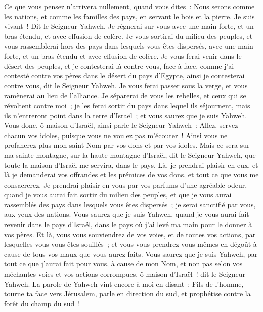 \begin{multicols}{2}
Ce que vous pensez n'arrivera nullement, quand vous dites~: Nous serons comme les nations, et comme les familles des pays, en servant le bois et la pierre.
Je suis vivant~! Dit le Seigneur Yahweh. Je règnerai sur vous avec une main forte, et un bras étendu, et avec effusion de colère.
Je vous sortirai du milieu des peuples, et vous rassemblerai hors des pays dans lesquels vous êtes dispersés, avec une main forte, et un bras étendu et avec effusion de colère.
Je vous ferai venir dans le désert des peuples, et je contesterai là contre vous, face à face,
comme j'ai contesté contre vos pères dans le désert du pays d'Egypte, ainsi je contesterai contre vous, dit le Seigneur Yahweh.
Je vous ferai passer sous la verge, et vous ramènerai au lieu de l'alliance.
Je séparerai de vous les rebelles, et ceux qui se révoltent contre moi~; je les ferai sortir du pays dans lequel ils séjournent, mais ils n'entreront point dans la terre d'Israël~; et vous saurez que je suis Yahweh.
Vous donc, ô maison d'Israël, ainsi parle le Seigneur Yahweh~: Allez, servez chacun vos idoles, puisque vous ne voulez pas m'écouter~! Ainsi vous ne profanerez plus mon saint Nom par vos dons et par vos idoles.
Mais ce sera sur ma sainte montagne, sur la haute montagne d'Israël, dit le Seigneur Yahweh, que toute la maison d'Israël me servira, dans le pays. Là, je prendrai plaisir en eux, et là je demanderai vos offrandes et les prémices de vos dons, et tout ce que vous me consacrerez.
Je prendrai plaisir en vous par vos parfums d'une agréable odeur, quand je vous aurai fait sortir du milieu des peuples, et que je vous aurai rassemblés des pays dans lesquels vous êtes dispersés~; je serai sanctifié par vous, aux yeux des nations.
Vous saurez que je suis Yahweh, quand je vous aurai fait revenir dans le pays d'Israël, dans le pays où j'ai levé ma main pour le donner à vos pères.
Et là, vous vous souviendrez de vos voies, et de toutes vos actions, par lesquelles vous vous êtes souillés~; et vous vous prendrez vous-mêmes en dégoût à cause de tous vos maux que vous aurez faits.
Vous saurez que je suis Yahweh, par tout ce que j'aurai fait pour vous, à cause de mon Nom, et non pas selon vos méchantes voies et vos actions corrompues, ô maison d'Israël~! dit le Seigneur Yahweh.
\VerseOne{}La parole de Yahweh vint encore à moi en disant~:
Fils de l'homme, tourne ta face vers Jérusalem, parle en direction du sud, et prophétise contre la forêt du champ du sud~!

\end{multicols}
